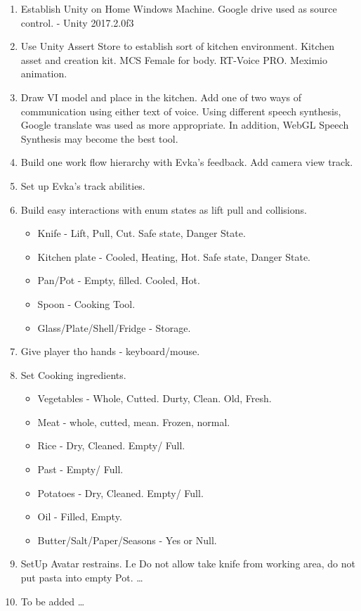 \documentclass[18pt]{article}
\numberwithin{equation}{section} %
\numberwithin{figure}{section} %
\numberwithin{table}{section} %
\begin{document}
	\begin{enumerate}
		\item Establish Unity on Home Windows Machine. Google drive used as source control. - Unity 2017.2.0f3
		\item Use Unity Assert Store to establish sort of kitchen environment. Kitchen asset and creation kit. MCS Female for body. RT-Voice PRO. Meximio animation. 
		\item Draw VI model and place in the kitchen. Add one of two ways of communication using either text of voice. Using different speech synthesis, Google translate was used as more appropriate. In addition, WebGL Speech Synthesis may become the best tool.
		\item Build one work flow hierarchy with Evka's feedback. Add camera view track.
		\item Set up Evka's track abilities.
		\item Build easy interactions with enum states as lift pull and collisions.
		\begin{itemize}
			\item Knife - Lift, Pull, Cut. Safe state, Danger State.
			\item Kitchen plate - Cooled, Heating, Hot. Safe state, Danger State.
			\item Pan/Pot - Empty, filled. Cooled, Hot.
			\item Spoon - Cooking Tool.
			\item Glass/Plate/Shell/Fridge - Storage.
		\end{itemize}
		\item Give player tho hands - keyboard/mouse.
		\item Set Cooking ingredients.
		\begin{itemize}
			\item Vegetables - Whole, Cutted. Durty, Clean. Old, Fresh.
			\item Meat - whole, cutted, mean. Frozen, normal.
			\item Rice - Dry, Cleaned. Empty/ Full.
			\item Past - Empty/ Full.
			\item Potatoes - Dry, Cleaned. Empty/ Full.
			\item Oil - Filled, Empty.
			\item Butter/Salt/Paper/Seasons - Yes or Null.
		\end{itemize}
		\item SetUp Avatar restrains. I.e Do not allow take knife from working area, do not put pasta into empty Pot. \ldots
		\item To be added \ldots
	
		
	\end{enumerate}
\end{document}
